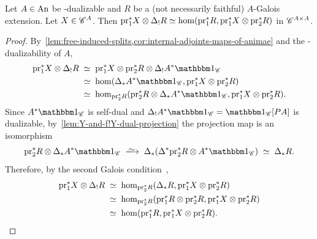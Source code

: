 \documentclass[english,svgnames,table]{article}
\begin{document}
    \begin{corollary}
    \label{cor:hom-R-R}
        Let $A\in \mathrm{An}$ be \COB-dualizable and $R$ be a (not necessarily faithful) $A$-Galois extension.
        Let $X \in \mathscr{C}^A$. Then $\mathrm{pr}_1^* X \otimes \Delta_! R \simeq \hom(\mathrm{pr}_1^* R, \mathrm{pr}_1^* X \otimes \mathrm{pr}_2^* R)$ in $\mathscr{C}^{A\times A}$.
    \end{corollary}
    \begin{proof}
        By~\cref{lem:free-induced-splits,cor:internal-adjoints-maps-of-animae} and the \CO-dualizability of $A$,
        \begin{equation*}
            \begin{split}
                \pr_1^* X \otimes \Delta_! R 
                & \;\simeq\; \pr_1^* X \otimes \pr_2^* R \otimes \Delta_! A^* \ounit_{\cC} \\
                & \;\simeq\; \hom(\Delta_* A^* \ounit_{\cC}, \pr_1^* X \otimes \pr_2^* R) \\
                & \;\simeq\; \hom_{\pr_2^* R}(\pr_2^* R \otimes \Delta_* A^* \ounit_{\cC}, \pr_1^* X \otimes \pr_2^* R).
            \end{split}
        \end{equation*}
        Since $A^* \ounit_{\cC}$ is self-dual and $\Delta_! A^* \ounit_{\cC} = \ounit_{\cC}[\Path A]$ is dualizable, by~\cref{lem:Y-and-f!Y-dual-projection} the projection map is an isomorphism
        \begin{equation*}
            \pr_2^* R \otimes \Delta_* A^* \ounit_{\cC} \;\isotoo\; \Delta_*(\Delta^* \pr_2^* R \otimes A^* \ounit_{\cC}) \;\simeq\; \Delta_* R.
        \end{equation*}
        Therefore, by the second Galois condition~,
        \begin{equation*}
            \begin{split}
                \mathrm{pr}_1^* X \otimes \Delta_! R 
                & \;\simeq\; \hom_{\mathrm{pr}_2^* R}(\Delta_* R, \mathrm{pr}_1^* X \otimes \mathrm{pr}_2^* R) \\
                & \;\simeq\; \hom_{\mathrm{pr}_2^* R}(\mathrm{pr}_1^* R \otimes \mathrm{pr}_2^* R, \mathrm{pr}_1^* X \otimes \mathrm{pr}_2^* R) \\
                & \;\simeq\; \hom(\mathrm{pr}_1^* R, \mathrm{pr}_1^*X \otimes \mathrm{pr}_2^* R).
            \end{split}
        \end{equation*}
    \end{proof}
    
\end{document}
